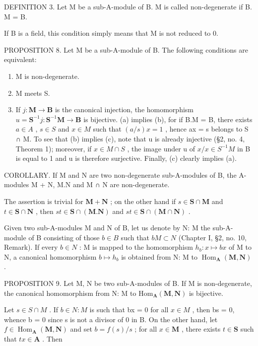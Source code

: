 DEFINITION 3. Let M be a sub-A-module of B. M is called non-degenerate if B. M = B.

If B is a field, this condition simply means that M is not reduced to 0.

PROPOSITION 8. Let M be a sub-A-module of B. The following conditions are equivalent:

\begin{enumerate}
\def\labelenumi{(\alph{enumi})}
\item
  M is non-degenerate.
\item
  M meets S.
\item
  If \(j: \mathbf{M} \to \mathbf{B}\) is the canonical injection, the homomorphism \(u = \mathbf{S}^{-1}j: \mathbf{S}^{-1}\mathbf{M} \to \mathbf{B}\) is bijective.
  (a) implies (b), for if B.M = B, there exists \(a \in A\) , \(s \in S\) and \(x \in M\) such that \((a/s)x = 1\) , hence ax = s belongs to S ∩ M. To see that (b) implies (c), note that u is already injective (§2, no. 4, Theorem 1); moreover, if \(x \in M \cap S\) , the image under u of \(x/x \in S^{-1}M\) in B is equal to 1 and u is therefore surjective. Finally, (c) clearly implies (a).
\end{enumerate}

COROLLARY. If M and N are two non-degenerate sub-A-modules of B, the A-modules M + N, M.N and M ∩ N are non-degenerate.

The assertion is trivial for \(\mathbf{M} + \mathbf{N}\) ; on the other hand if \(s \in \mathbf{S} \cap \mathbf{M}\) and \(t \in \mathbf{S} \cap \mathbf{N}\) , then \(st \in \mathbf{S} \cap (\mathbf{M}. \mathbf{N})\) and \(st \in \mathbf{S} \cap (\mathbf{M} \cap \mathbf{N})\) .

Given two sub-A-modules M and N of B, let us denote by N: M the sub-A-module of B consisting of those \(b \in B\) such that \(bM \subset N\) (Chapter I, §2, no. 10, Remark). If every \(b \in N\) : M is mapped to the homomorphism \(h_{b}: x \mapsto bx\) of M to N, a canonical homomorphism \(b \mapsto h_{b}\) is obtained from N: M to \(\operatorname{Hom}_{\mathbf{A}}(\mathbf{M}, \mathbf{N})\) .

PROPOSITION 9. Let M, N be two sub-A-modules of B. If M is non-degenerate, the canonical homomorphism from N: M to \(\mathrm{Hom}_{\mathbf{A}}(\mathbf{M},\mathbf{N})\) is bijective.

Let \(s \in S \cap M\) . If \(b \in N: M\) is such that bx = 0 for all \(x \in M\) , then bs = 0, whence b = 0 since s is not a divisor of 0 in B. On the other hand, let \(f \in \operatorname{Hom}_{\mathbf{A}}(\mathbf{M}, \mathbf{N})\) and set \(b = f(s) / s\) ; for all \(x \in \mathbf{M}\) , there exists \(t \in \mathbf{S}\) such that \(tx \in \mathbf{A}\) . Then

